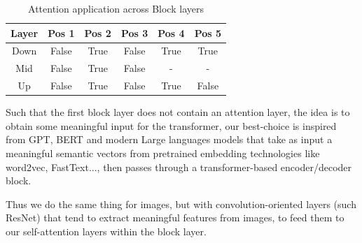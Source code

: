 \documentclass[twocolumn,superscriptaddress,aps]{revtex4-1}
\begin{document}
\begin{table}[h!]
	\centering
	\begin{tabular}{|c|c|c|c|c|c|}
		\hline
		\textbf{Layer} & \textbf{Pos 1} & \textbf{Pos 2} & \textbf{Pos 3} & \textbf{Pos 4} & \textbf{Pos 5} \\
		\hline
		Down           & False          & True           & False          & True           & True           \\
		Mid            & False          & True           & False          & -              & -              \\
		Up             & False          & True           & False          & True           & False          \\
		\hline
	\end{tabular}
	\label{tab:attention_application}
	\caption{Attention application across Block layers}
\end{table}
Such that the first block layer does not contain an attention layer, the idea is to obtain some meaningful input for the transformer, our best-choice is inspired from GPT, BERT and modern Large languages models that take as input a meaningful semantic vectors from pretrained embedding technologies like word2vec, FastText..., then passes through a transformer-based encoder/decoder block.

Thus we do the same thing for images, but with convolution-oriented layers (such ResNet) that tend to extract meaningful features from images, to feed them to our self-attention layers within the block layer.
\end{document}
